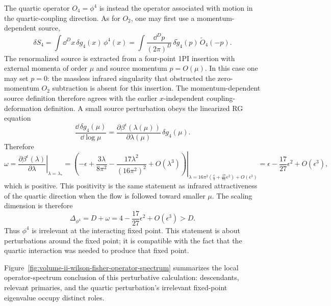 The quartic operator \(O_4=\phi^4\) is instead the operator associated with
motion in the quartic-coupling direction.  As for \(O_2\), one may first use a
momentum-dependent source,
\[
  \delta S_4
  =
  \int\dd^D x\,\delta g_4(x)\,\phi^4(x)
  =
  \int\frac{\dd^Dp}{(2\pi)^D}\,
  \delta\widetilde g_4(p)\,\widetilde O_4(-p).
\]
The renormalized source is extracted from a four-point 1PI insertion with
external momenta of order \(\mu\) and source momentum \(p=O(\mu)\).  In this
case one may set \(p=0\): the massless infrared singularity that obstructed
the zero-momentum \(O_2\) subtraction is absent for this insertion.  The
momentum-dependent source definition therefore agrees with the earlier
\(x\)-independent coupling-deformation definition.
A small source perturbation obeys the linearized RG equation
\[
  \frac{\dd\,\delta g_4(\mu)}{\dd\log\mu}
  =
  \frac{\partial\beta^\epsilon(\lambda(\mu))}
       {\partial\lambda(\mu)}
  \,\delta g_4(\mu).
\]
Therefore
\[
  \omega
  =
  \left.
  \frac{\partial\beta^\epsilon(\lambda)}{\partial\lambda}
  \right|_{\lambda=\lambda_*}
  =
  \left.
  \left(
    -\epsilon+\frac{3\lambda}{8\pi^2}
    -\frac{17\lambda^2}{(16\pi^2)^2}
    +O(\lambda^3)
  \right)
  \right|_{\lambda=16\pi^2
    \left(\frac{\epsilon}{3}+\frac{17}{81}\epsilon^2\right)
    +O(\epsilon^3)}
  =
  \epsilon-\frac{17}{27}\epsilon^2+O(\epsilon^3),
\]
which is positive.  This positivity is the same statement as infrared
attractiveness of the quartic direction when the flow is followed toward
smaller \(\mu\).
The scaling dimension is therefore
\[
  \Delta_{\phi^4}
  =
  D+\omega
  =
  4-\frac{17}{27}\epsilon^2+O(\epsilon^3)
  >
  D.
\]
Thus \(\phi^4\) is irrelevant at the interacting fixed point.  This statement
is about perturbations around the fixed point; it is compatible with the fact
that the quartic interaction was needed to produce that fixed point.

Figure~\ref{fig:volume-ii-wilson-fisher-operator-spectrum} summarizes the local
operator-spectrum conclusion of this perturbative calculation: descendants,
relevant primaries, and the quartic perturbation's irrelevant fixed-point
eigenvalue occupy distinct roles.


